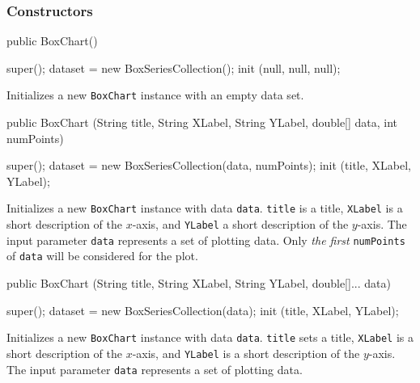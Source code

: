 \subsubsection*{Constructors}

\begin{code}

   public BoxChart() \begin{hide} {
      super();
      dataset = new BoxSeriesCollection();
      init (null, null, null);
   }\end{hide}
\end{code}
\begin{tabb}
   Initializes a new \texttt{BoxChart} instance with an empty data set.
\end{tabb}
\begin{code}

   public BoxChart (String title, String XLabel, String YLabel,
                    double[] data, int numPoints) \begin{hide} {
      super();
      dataset = new BoxSeriesCollection(data, numPoints);
      init (title, XLabel, YLabel);
   }\end{hide}
\end{code}
\begin{tabb}
Initializes a new \texttt{BoxChart} instance with data \texttt{data}.
\texttt{title} is a title, \texttt{XLabel} is a short description of the
$x$-axis, and \texttt{YLabel} a short description of the $y$-axis.
The input parameter \texttt{data} represents a set of plotting data.
 Only \emph{the first} \texttt{numPoints} of \texttt{data} will
  be considered for the plot.
\end{tabb}
\begin{htmlonly}
\end{htmlonly}
\begin{code}

   public BoxChart (String title, String XLabel, String YLabel,
                    double[]... data) \begin{hide} {
      super();
      dataset = new BoxSeriesCollection(data);
      init (title, XLabel, YLabel);
   }\end{hide}
\end{code}
\begin{tabb}
Initializes a new \texttt{BoxChart} instance with data \texttt{data}.
\texttt{title} sets a title, \texttt{XLabel} is a short description of the
$x$-axis, and \texttt{YLabel} is a short description of the $y$-axis.
The input parameter \texttt{data} represents a set of plotting data.
\end{tabb}
\begin{htmlonly}
\end{htmlonly}

